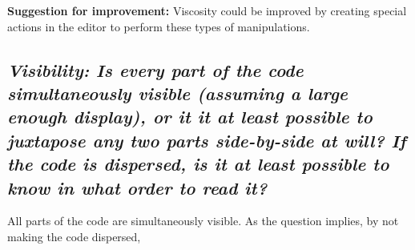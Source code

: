 \textbf{Suggestion for improvement:} Viscosity could be improved by creating special actions in the editor to perform these types of manipulations.  


\subsection*{\emph{Visibility: Is every part of the code simultaneously visible (assuming a large enough display), or it it at least possible to juxtapose any two parts side-by-side at will? If the code is dispersed, is it at least possible to know in what order to read it?}}

All parts of the code are simultaneously visible. 
As the question implies, by not making the code dispersed, 













